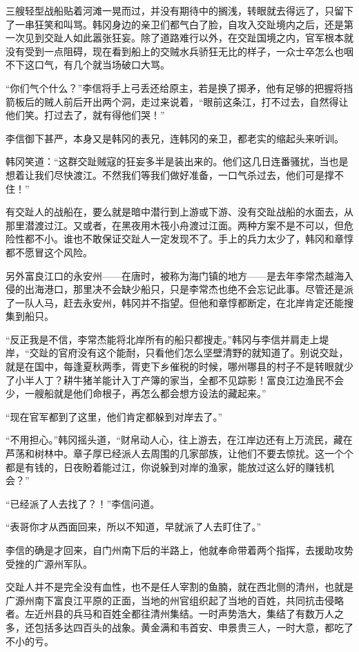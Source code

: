 三艘轻型战船贴着河滩一晃而过，并没有期待中的搁浅，转眼就去得远了，只留下了一串狂笑和叫骂。韩冈身边的亲卫们都气白了脸，自攻入交趾境内之后，还是第一次见到交趾人如此嚣张狂妄。除了道路难行以外，在交趾国境之内，官军根本就没有受到一点阻碍，现在看到船上的交贼水兵骄狂无比的样子，一众士卒怎么也咽不下这口气，有几个就当场破口大骂。

“你们气个什么？”李信将手上弓丢还给原主，若是换了掷矛，他有足够的把握将挡箭板后的贼人前后开出两个洞，走过来说着，“眼前这条江，打不过去，自然得让他们笑。打过去了，就有得他们哭！”

李信御下甚严，本身又是韩冈的表兄，连韩冈的亲卫，都老实的缩起头来听训。

韩冈笑道：“这群交趾贼寇的狂妄多半是装出来的。他们这几日连番骚扰，当也是想着让我们尽快渡江。不然我们等我们做好准备，一口气杀过去，他们可是撑不住！”

有交趾人的战船在，要么就是暗中潜行到上游或下游、没有交趾战船的水面去，从那里潜渡过江。又或者，在黑夜用木筏小舟渡过江面。两种方案不是不可以，但危险性都不小。谁也不敢保证交趾人一定发现不了。手上的兵力太少了，韩冈和章惇都不愿冒这个风险。

另外富良江口的永安州——在唐时，被称为海门镇的地方——是去年李常杰越海入侵的出海港口，那里决不会缺少船只，只是李常杰也绝不会忘记此事。尽管还是派了一队人马，赶去永安州，韩冈并不指望。但他和章惇都断定，在北岸肯定还能搜集到船只。

“反正我是不信，李常杰能将北岸所有的船只都搜走。”韩冈与李信并肩走上堤岸，“交趾的官府没有这个能耐，只看他们怎么坚壁清野的就知道了。别说交趾，就是在国中，每逢夏秋两季，胥吏下乡催税的时候，哪州哪县的村子不是转眼就少了小半人丁？耕牛猪羊能计入丁产簿的家当，全都不见踪影！富良江边渔民不会少，一艘船就是他们命根子，再怎么都会想方设法的藏起来。”

“现在官军都到了这里，他们肯定都躲到对岸去了。”

“不用担心。”韩冈摇头道，“财帛动人心，往上游去，在江岸边还有上万流民，藏在芦荡和树林中。章子厚已经派人去周围的几家部族，让他们不要去惊扰。这一个个都是有钱的，日夜盼着能过江，你说躲到对岸的渔家，能放过这么好的赚钱机会？”

“已经派了人去找了？！”李信问道。

“表哥你才从西面回来，所以不知道，早就派了人去盯住了。”

李信的确是才回来，自门州南下后的半路上，他就奉命带着两个指挥，去援助攻势受挫的广源州军队。

交趾人并不是完全没有血性，也不是任人宰割的鱼腩，就在西北侧的清州，也就是广源州南下富良江平原的正面，当地的州官组织起了当地的百姓，共同抗击侵略者。左近州县的兵马和百姓全都往清州集结。一时声势浩大，集结了有数万人之多，还包括多达四百头的战象。黄金满和韦首安、申景贵三人，一时大意，都吃了不小的亏。

